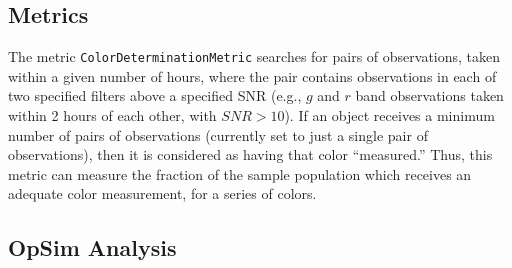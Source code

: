 
\subsection{Metrics}
\label{sec:\secname:metrics}

The metric {\tt ColorDeterminationMetric} searches for pairs of
observations, taken within a given number of hours, where the pair
contains observations in each of two specified filters above a
specified SNR (e.g., $g$ and $r$ band observations taken within 2
hours of each other, with $SNR>10$). If an object receives a minimum
number of pairs of observations (currently set to just a single pair
of observations), then it is considered as having that color
``measured.'' Thus, this metric can measure the fraction of the sample
population which receives an adequate color measurement, for a series
of colors.



\subsection{OpSim Analysis}
\label{sec:\secname:analysis}


